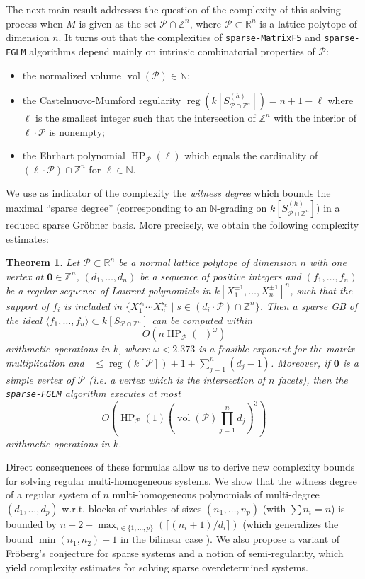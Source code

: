 \documentclass[12pt]{article}
\numberwithin{equation}{section}
\newtheorem{theorem}{Theorem}
\numberwithin{theorem}{section}
\newcommand{\Z}{\mathbb{Z}}
\DeclareMathOperator{\vol}{vol}
\DeclareMathOperator{\HP}{HP}
\newcommand{\sgp}{S}
\newcommand{\polytope}{\mathscr P}
\DeclareMathOperator{\reg}{reg}
\DeclareMathOperator{\dwit}{d_{wit}}
\newcommand{\R}{\mathbb{R}}
\newcommand{\N}{\mathbb{N}}
\begin{document}
The next main result addresses the question of the complexity of this solving process when $M$ is given as the set $\polytope\cap\Z^n$, where $\polytope\subset\R^n$ is a lattice polytope of dimension $n$. It turns out that the complexities of {\tt sparse-MatrixF5} and {\tt sparse-FGLM} algorithms depend mainly on intrinsic combinatorial properties of $\polytope$:
\begin{itemize}
\item the normalized volume $\vol(\polytope)\in\N$;
\item the Castelnuovo-Mumford regularity $\reg(k[\sgp_{\polytope\cap\Z^n}^{(h)}])=n+1-\ell$ where $\ell$ is the smallest integer such that the intersection of $\Z^n$ with the interior of $\ell\cdot\polytope$ is nonempty;
\item the Ehrhart polynomial $\HP_\polytope(\ell)$ which equals the cardinality of $(\ell\cdot\polytope)\cap \Z^n$ for $\ell\in\N$.
\end{itemize}

We use as indicator of the complexity the \emph{witness degree} which
bounds the maximal ``sparse degree'' (corresponding to an $\N$-grading
on $k[\sgp_{\polytope\cap\Z^n}^{(h)}]$) in a reduced sparse Gr\"obner
basis.  More precisely, we obtain the following complexity estimates:

\begin{theorem}\label{theo:mainres}
Let $\polytope\subset\R^n$ be a normal lattice polytope of dimension
$n$ with one vertex at $\mathbf 0\in\Z^n$, $(d_1,\ldots,d_n)$ be a sequence of positive integers and
$(f_1,\ldots, f_n)$ be a regular sequence of Laurent polynomials in $k[X_1^{\pm 1},\ldots, X_n^{\pm 1}]^n$, such that the support of $f_i$
is included in $\{X_1^{s_1}\cdots X_n^{s_n}\mid s\in (d_i\cdot\polytope)\cap \Z^n\}$. Then a sparse GB of the
ideal $\langle f_1,\ldots, f_n\rangle\subset k[\sgp_{\polytope\cap \Z^n}]$ can be computed
within
$$O\left(n \HP_\polytope(\dwit)^\omega\right)$$ arithmetic operations
in $k$, where 
$\omega<2.373$ is a feasible exponent for the matrix multiplication
and $\dwit\leq\reg(k[\polytope])+1+\sum_{j=1}^n(d_j-1)$.
Moreover, if $\mathbf 0$ is a simple vertex of $\polytope$
(\emph{i.e.} a vertex which is the intersection of $n$ facets), then the
{\tt sparse-FGLM} algorithm executes at most
$$O\left(\HP_\polytope(1) \left(\vol(\polytope) \prod_{j=1}^n d_j\right)^3\right)$$
arithmetic operations in $k$.
\end{theorem}


Direct consequences of these formulas allow us to derive new
complexity bounds for solving regular multi-homo\-ge\-ne\-ous systems.
We show that the witness degree of a regular system of
$n$ multi-homogeneous polynomials of multi-degree $(d_1,\ldots,d_p)$
w.r.t. blocks of variables of sizes $(n_1,\ldots, n_p)$ (with $\sum
n_i=n$) is bounded by $n+2-\max_{i\in\{1,\ldots,p\}}(\lceil
(n_i+1)/d_i\rceil)$ (which generalizes the bound $\min(n_1,n_2)+1$ in
the bilinear case \cite{faugere2011grobner}). We also propose a variant of Fr\"oberg's
conjecture for sparse systems and a notion of semi-regularity, which
yield complexity estimates for solving sparse overdetermined systems.
\end{document}
